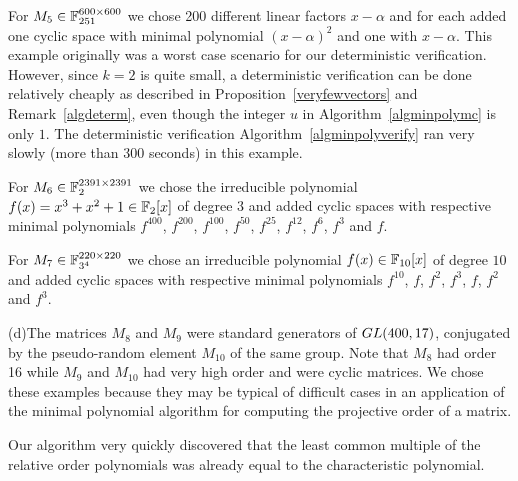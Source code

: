 For $M_5 \in \mathbb{F}_{251}^{600 \times 600}$ we chose 200 different linear
factors $x-\alpha$ and for each added one cyclic space with minimal polynomial
$(x-\alpha)^2$ and one with $x-\alpha$. This example originally was a
worst case scenario for our deterministic verification. However, since $k=2$ is 
%
quite small, a deterministic verification can be done relatively
cheaply as described in Proposition~\ref{veryfewvectors} and
Remark~\ref{algdeterm}, even though the integer $u$ in
Algorithm~\ref{algminpolymc} is only $1$. The deterministic
verification Algorithm~\ref{algminpolyverify} ran very slowly 
(more than 300 seconds) in this example.

For $M_6 \in \mathbb{F}_2^{2391 \times 2391}$ we chose the irreducible polynomial
$f(x) = x^3+x^2+1 \in \mathbb{F}_2[x]$ of degree $3$ and added cyclic spaces with 
respective minimal polynomials $f^{400}$, $f^{200}$, $f^{100}$,
$f^{50}$, $f^{25}$, $f^{12}$, $f^6$, $f^3$ and $f$.

For $M_7 \in \mathbb{F}_{3^4}^{220 \times 220}$ we chose an irreducible polynomial
$f(x) \in \mathbb{F}_{10}[x]$ of degree $10$ and added cyclic spaces with
respective minimal polynomials $f^{10}$, $f$, $f^2$, $f^3$, $f$, $f^2$ and
$f^3$.

(d)\quad The matrices $M_8$ and $M_9$ were standard generators of 
${\rm GL}(400,17)$, 
conjugated by the pseu\-do-ran\-dom element $M_{10}$ of the same group.
Note that $M_8$ had
order 16 while $M_9$ and $M_{10}$ had very high order and were cyclic 
matrices. We chose these examples because they may be typical of 
difficult cases in an application of the minimal polynomial algorithm
for computing the projective order of a matrix. 

Our algorithm %
very quickly discovered that the least common multiple of the relative order
polynomials was already equal to the characteristic polynomial.

